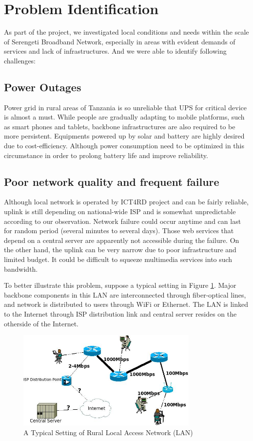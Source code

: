 \section{Problem Identification}
As part of the project, we investigated local conditions and needs within the scale of Serengeti Broadband Network, especially in areas with evident demands of services and lack of infrastructures. And we were able to identify following challenges:

\subsection{Power Outages}
Power grid in rural areas of Tanzania is so unreliable that UPS for critical device is almost a must. While people are gradually adapting to mobile platforms, such as smart phones and tablets, backbone infrastructures are also required to be more persistent. Equipments powered up by solar and battery are highly desired due to cost-efficiency. Although power consumption need to be optimized in this circumstance in order to prolong battery life and improve reliability.

\subsection{Poor network quality and frequent failure}
Although local network is operated by ICT4RD project and can be fairly reliable, uplink is still depending on national-wide ISP and is somewhat unpredictable according to our observation. Network failure could occur anytime and can last for random period (several minutes to several days). Those web services that depend on a central server are apparently not accessible during the failure. On the other hand, the uplink can be very narrow due to poor infrastructure and limited budget. It could be difficult to squeeze multimedia services into such bandwidth.

To better illustrate this problem, suppose a typical setting in Figure \ref{rural_lan}. Major backbone components in this LAN are interconnected through fiber-optical lines, and network is distributed to users through WiFi or Ethernet. The LAN is linked to the Internet through ISP distribution link and central server resides on the otherside of the Internet.

\begin{figure}[htbp]
\centering
\includegraphics[width=0.8\textwidth]{../images/brief_diagram_of_sbn_network.jpeg}
\caption{A Typical Setting of Rural Local Access Network (LAN)}
\label{rural_lan}
\end{figure}

